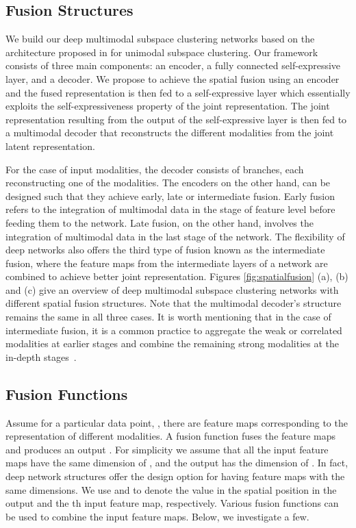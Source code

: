 \documentclass[journal]{IEEEtran}
\begin{document}
\subsection{Fusion Structures}
We build our deep multimodal subspace clustering networks based on the architecture proposed in \cite{deepsc17nips} for unimodal subspace clustering.  Our framework consists of three main components: an encoder, a fully connected self-expressive layer, and a decoder.		   We propose to achieve the spatial fusion using an encoder and the fused representation is then fed to a self-expressive layer which essentially exploits the self-expressiveness property of the joint representation.		  The joint representation resulting from the output of the self-expressive layer is then fed to a multimodal decoder that reconstructs the different modalities from the joint latent representation.		

For the case of  input modalities, the decoder consists of  branches, each reconstructing one of the modalities.  The encoders on the other hand, can be designed such that they achieve  early, late or intermediate fusion.  Early fusion refers to the integration of multimodal data in the stage of feature level before feeding them to the network.		  Late fusion, on the other hand, involves the integration of multimodal data in the last stage of the network. The flexibility of deep networks also offers the third type of fusion known as the intermediate fusion, where the feature maps from the intermediate layers of a network are combined to achieve better joint representation. 	Figures \ref{fig:spatialfusion} (a), (b) and (c) give an overview of deep multimodal subspace clustering networks with different spatial fusion structures.		 Note that the multimodal decoder's structure remains the same in all three cases.  It is worth mentioning that in the case of intermediate fusion, it is a common practice to aggregate the weak or correlated modalities at earlier stages and combine the remaining strong modalities at the in-depth stages~\cite{ramachandram2017deep}.		



\subsection{Fusion Functions}
Assume for a particular data point, , there are  feature maps corresponding to the representation of different modalities.		A fusion function  fuses the  feature maps and produces an output .		   For simplicity we assume that all the input feature maps have the same dimension of , and the output has the dimension of 
.		  In fact, deep network structures offer the design option for having feature maps with the same dimensions.		 We use   and   to denote the value in the spatial position  in the output and the th input feature map, respectively.  Various fusion functions can be used to combine the input feature maps.  Below, we investigate a few.  
\end{document}
